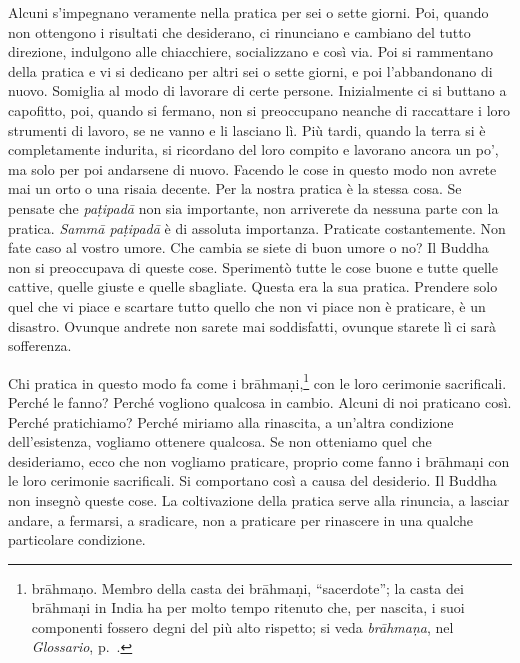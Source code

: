 Alcuni s'impegnano veramente nella pratica per sei o sette giorni. Poi,
quando non ottengono i risultati che desiderano, ci rinunciano e
cambiano del tutto direzione, indulgono alle chiacchiere, socializzano e
così via. Poi si rammentano della pratica e vi si dedicano per altri sei
o sette giorni, e poi l'abbandonano di nuovo. Somiglia al modo di
lavorare di certe persone. Inizialmente ci si buttano a capofitto, poi,
quando si fermano, non si preoccupano neanche di raccattare i loro
strumenti di lavoro, se ne vanno e li lasciano lì. Più tardi, quando la
terra si è completamente indurita, si ricordano del loro compito e
lavorano ancora un po', ma solo per poi andarsene di nuovo. Facendo le
cose in questo modo non avrete mai un orto o una risaia decente. Per la
nostra pratica è la stessa cosa. Se pensate che \emph{paṭipadā} non sia
importante, non arriverete da nessuna parte con la pratica. \emph{Sammā
paṭipadā} è di assoluta importanza. Praticate costantemente. Non fate
caso al vostro umore. Che cambia se siete di buon umore o no? Il Buddha
non si preoccupava di queste cose. Sperimentò tutte le cose buone e
tutte quelle cattive, quelle giuste e quelle sbagliate. Questa era la
sua pratica. Prendere solo quel che vi piace e scartare tutto quello che
non vi piace non è praticare, è un disastro. Ovunque andrete non sarete
mai soddisfatti, ovunque starete lì ci sarà sofferenza.

Chi pratica in questo modo fa come i brāhmaṇi,\footnote{brāhmaṇo. Membro
  della casta dei brāhmaṇi, ``sacerdote''; la casta dei brāhmaṇi in
  India ha per molto tempo ritenuto che, per nascita, i suoi componenti
  fossero degni del più alto rispetto; si veda \emph{brāhmaṇa}, nel
  \emph{Glossario}, p.~\pageref{glossary-brahmana}.} con le loro cerimonie sacrificali. Perché le fanno?
Perché vogliono qualcosa in cambio. Alcuni di noi praticano così. Perché
pratichiamo? Perché miriamo alla rinascita, a un'altra condizione
dell'esistenza, vogliamo ottenere qualcosa. Se non otteniamo quel che
desideriamo, ecco che non vogliamo praticare, proprio come fanno i
brāhmaṇi con le loro cerimonie sacrificali. Si comportano così a causa
del desiderio. Il Buddha non insegnò queste cose. La coltivazione della
pratica serve alla rinuncia, a lasciar andare, a fermarsi, a sradicare,
non a praticare per rinascere in una qualche particolare condizione.

